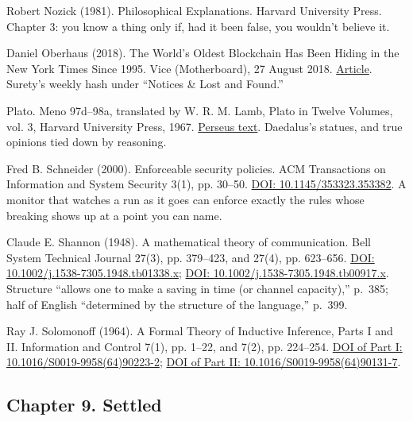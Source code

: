 \documentclass[11pt,twoside]{article}
\theoremstyle{thielethm}
\theoremstyle{thieledef}
\theoremstyle{thieledef}
\theoremstyle{thieledef}
\theoremstyle{thielethm}
\theoremstyle{thieleobs}
\theoremstyle{thielethm}
\begin{document}
\noindent Robert Nozick (1981). Philosophical Explanations. Harvard University Press. Chapter 3: you know a thing only if, had it been false, you wouldn't believe it.
\par\medskip

\noindent Daniel Oberhaus (2018). The World's Oldest Blockchain Has Been Hiding in the New York Times Since 1995. Vice (Motherboard), 27 August 2018. \href{https://www.vice.com/en/article/what-was-the-first-blockchain/}{Article}. Surety's weekly hash under ``Notices \& Lost and Found.''
\par\medskip

\noindent Plato. Meno 97d--98a, translated by W. R. M. Lamb, Plato in Twelve Volumes, vol. 3, Harvard University Press, 1967. \href{http://www.perseus.tufts.edu/hopper/text?doc=Plat.+Meno+97d}{Perseus text}. Daedalus's statues, and true opinions tied down by reasoning.
\par\medskip

\noindent Fred B. Schneider (2000). Enforceable security policies. ACM Transactions on Information and System Security 3(1), pp. 30--50. \href{https://doi.org/10.1145/353323.353382}{DOI: 10.1145/353323.353382}. A monitor that watches a run as it goes can enforce exactly the rules whose breaking shows up at a point you can name.
\par\medskip

\noindent Claude E. Shannon (1948). A mathematical theory of communication. Bell System Technical Journal 27(3), pp. 379--423, and 27(4), pp. 623--656. \href{https://doi.org/10.1002/j.1538-7305.1948.tb01338.x}{DOI: 10.1002/j.1538-7305.1948.tb01338.x}; \href{https://doi.org/10.1002/j.1538-7305.1948.tb00917.x}{DOI: 10.1002/j.1538-7305.1948.tb00917.x}. Structure ``allows one to make a saving in time (or channel capacity),'' p.~385; half of English ``determined by the structure of the language,'' p.~399.
\par\medskip

\noindent Ray J. Solomonoff (1964). A Formal Theory of Inductive Inference, Parts I and II. Information and Control 7(1), pp. 1--22, and 7(2), pp. 224--254. \href{https://doi.org/10.1016/S0019-9958(64)90223-2}{DOI of Part I: 10.1016/S0019-9958(64)90223-2}; \href{https://doi.org/10.1016/S0019-9958(64)90131-7}{DOI of Part II: 10.1016/S0019-9958(64)90131-7}.
\par\medskip

\subsection*{Chapter 9. Settled}
\end{document}
